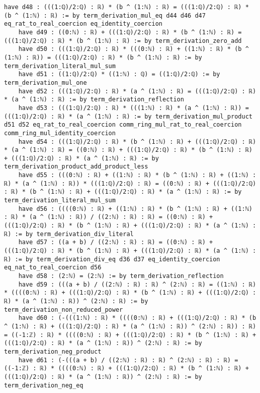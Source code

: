 \documentclass{article}
\begin{document}
\begin{tcolorbox}[colback=white!10, width=\linewidth]
\begin{lstlisting}[language=Lean4]
    have d48 : (((1:ℚ)/2:ℚ) : ℝ) * (b ^ (1:ℕ) : ℝ) = (((1:ℚ)/2:ℚ) : ℝ) * (b ^ (1:ℕ) : ℝ) := by term_derivation_mul_eq d44 d46 d47 eq_rat_to_real_coercion eq_identity_coercion
    have d49 : ((0:ℕ) : ℝ) + (((1:ℚ)/2:ℚ) : ℝ) * (b ^ (1:ℕ) : ℝ) = (((1:ℚ)/2:ℚ) : ℝ) * (b ^ (1:ℕ) : ℝ) := by term_derivation_zero_add
    have d50 : (((1:ℚ)/2:ℚ) : ℝ) * (((0:ℕ) : ℝ) + ((1:ℕ) : ℝ) * (b ^ (1:ℕ) : ℝ)) = (((1:ℚ)/2:ℚ) : ℝ) * (b ^ (1:ℕ) : ℝ) := by term_derivation_literal_mul_sum
    have d51 : ((1:ℚ)/2:ℚ) * ((1:ℕ) : ℚ) = ((1:ℚ)/2:ℚ) := by term_derivation_mul_one
    have d52 : (((1:ℚ)/2:ℚ) : ℝ) * (a ^ (1:ℕ) : ℝ) = (((1:ℚ)/2:ℚ) : ℝ) * (a ^ (1:ℕ) : ℝ) := by term_derivation_reflection
    have d53 : (((1:ℚ)/2:ℚ) : ℝ) * (((1:ℕ) : ℝ) * (a ^ (1:ℕ) : ℝ)) = (((1:ℚ)/2:ℚ) : ℝ) * (a ^ (1:ℕ) : ℝ) := by term_derivation_mul_product d51 d52 eq_rat_to_real_coercion comm_ring_mul_rat_to_real_coercion comm_ring_mul_identity_coercion
    have d54 : (((1:ℚ)/2:ℚ) : ℝ) * (b ^ (1:ℕ) : ℝ) + (((1:ℚ)/2:ℚ) : ℝ) * (a ^ (1:ℕ) : ℝ) = ((0:ℕ) : ℝ) + (((1:ℚ)/2:ℚ) : ℝ) * (b ^ (1:ℕ) : ℝ) + (((1:ℚ)/2:ℚ) : ℝ) * (a ^ (1:ℕ) : ℝ) := by term_derivation_product_add_product_less
    have d55 : (((0:ℕ) : ℝ) + ((1:ℕ) : ℝ) * (b ^ (1:ℕ) : ℝ) + ((1:ℕ) : ℝ) * (a ^ (1:ℕ) : ℝ)) * (((1:ℚ)/2:ℚ) : ℝ) = ((0:ℕ) : ℝ) + (((1:ℚ)/2:ℚ) : ℝ) * (b ^ (1:ℕ) : ℝ) + (((1:ℚ)/2:ℚ) : ℝ) * (a ^ (1:ℕ) : ℝ) := by term_derivation_literal_mul_sum
    have d56 : ((((0:ℕ) : ℝ) + ((1:ℕ) : ℝ) * (b ^ (1:ℕ) : ℝ) + ((1:ℕ) : ℝ) * (a ^ (1:ℕ) : ℝ)) / ((2:ℕ) : ℝ) : ℝ) = ((0:ℕ) : ℝ) + (((1:ℚ)/2:ℚ) : ℝ) * (b ^ (1:ℕ) : ℝ) + (((1:ℚ)/2:ℚ) : ℝ) * (a ^ (1:ℕ) : ℝ) := by term_derivation_div_literal
    have d57 : ((a + b) / ((2:ℕ) : ℝ) : ℝ) = ((0:ℕ) : ℝ) + (((1:ℚ)/2:ℚ) : ℝ) * (b ^ (1:ℕ) : ℝ) + (((1:ℚ)/2:ℚ) : ℝ) * (a ^ (1:ℕ) : ℝ) := by term_derivation_div_eq d36 d37 eq_identity_coercion eq_nat_to_real_coercion d56
    have d58 : (2:ℕ) = (2:ℕ) := by term_derivation_reflection
    have d59 : (((a + b) / ((2:ℕ) : ℝ) : ℝ) ^ (2:ℕ) : ℝ) = ((1:ℕ) : ℝ) * ((((0:ℕ) : ℝ) + (((1:ℚ)/2:ℚ) : ℝ) * (b ^ (1:ℕ) : ℝ) + (((1:ℚ)/2:ℚ) : ℝ) * (a ^ (1:ℕ) : ℝ)) ^ (2:ℕ) : ℝ) := by term_derivation_non_reduced_power
    have d60 : (-(((1:ℕ) : ℝ) * ((((0:ℕ) : ℝ) + (((1:ℚ)/2:ℚ) : ℝ) * (b ^ (1:ℕ) : ℝ) + (((1:ℚ)/2:ℚ) : ℝ) * (a ^ (1:ℕ) : ℝ)) ^ (2:ℕ) : ℝ)) : ℝ) = ((-1:ℤ) : ℝ) * ((((0:ℕ) : ℝ) + (((1:ℚ)/2:ℚ) : ℝ) * (b ^ (1:ℕ) : ℝ) + (((1:ℚ)/2:ℚ) : ℝ) * (a ^ (1:ℕ) : ℝ)) ^ (2:ℕ) : ℝ) := by term_derivation_neg_product
    have d61 : (-(((a + b) / ((2:ℕ) : ℝ) : ℝ) ^ (2:ℕ) : ℝ) : ℝ) = ((-1:ℤ) : ℝ) * ((((0:ℕ) : ℝ) + (((1:ℚ)/2:ℚ) : ℝ) * (b ^ (1:ℕ) : ℝ) + (((1:ℚ)/2:ℚ) : ℝ) * (a ^ (1:ℕ) : ℝ)) ^ (2:ℕ) : ℝ) := by term_derivation_neg_eq

\end{lstlisting}
\end{tcolorbox}
\end{document}
